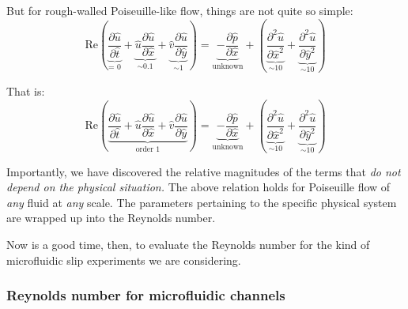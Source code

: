 \documentclass[12pt, a4paper, twoside, openright]{book}
\begin{document}
But for rough-walled Poiseuille-like flow, things are not quite so simple:
\begin{equation}
\mathrm{Re} \left( 
\underbrace{ \frac{\partial \hat{u}}{\partial \hat{t}} }_{\text{= 0}} +
\underbrace{ \hat{u} \frac{\partial \hat{u}}{\partial \hat{x}} }_{\sim 0.1} +
\underbrace{ \hat{v} \frac{\partial \hat{u}}{\partial \hat{y}} }_{\sim 1} 
\right) = 
\underbrace{ - \frac{\partial \hat{p}}{\partial \hat{x}} }_{\text{unknown}}
  + \left( 
\underbrace{ \frac{\partial^2 \hat{u}}{\partial \hat{x}^2} }_{\sim 10} + 
\underbrace{ \frac{\partial^2 \hat{u}}{\partial \hat{y}^2} }_{\sim 10} 
\right)
\end{equation}

That is:
\begin{equation}
\mathrm{Re} \left( 
\underbrace{ \frac{\partial \hat{u}}{\partial \hat{t}}  +
     \hat{u} \frac{\partial \hat{u}}{\partial \hat{x}}  +
     \hat{v} \frac{\partial \hat{u}}{\partial \hat{y}} }_{\text{order 1}} 
\right) = 
\underbrace{ - \frac{\partial \hat{p}}{\partial \hat{x}} }_{\text{unknown}}
  + \left( 
\underbrace{ \frac{\partial^2 \hat{u}}{\partial \hat{x}^2} }_{\sim 10} + 
\underbrace{ \frac{\partial^2 \hat{u}}{\partial \hat{y}^2} }_{\sim 10} 
\right)
\end{equation}


Importantly, we have discovered the relative magnitudes of the terms that \emph{do not depend on the physical situation.}  The above relation holds for Poiseuille flow of \emph{any} fluid at \emph{any} scale.  The parameters pertaining to the specific physical system are wrapped up into the Reynolds number.

Now is a good time, then, to evaluate the Reynolds number for the kind of microfluidic slip experiments we are considering.

\subsubsection{Reynolds number for microfluidic channels}
\end{document}
